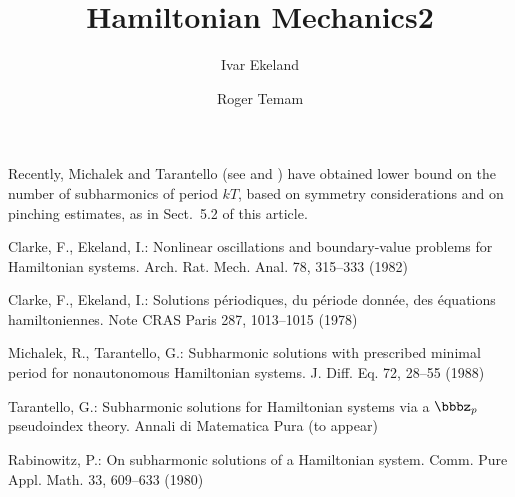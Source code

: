 \documentclass{llncs}
\begin{document}
    Recently, Michalek and Tarantello (see \cite{mich:tar} and \cite{tar})
    have obtained lower bound on the number of subharmonics of period $kT$,
    based on symmetry considerations and on pinching estimates, as in
    Sect.~5.2 of this article.
    
    \begin{thebibliography}{5}
    Clarke, F., Ekeland, I.:
    Nonlinear oscillations and
    boundary-value problems for Hamiltonian systems.
    Arch. Rat. Mech. Anal. 78, 315--333 (1982)
    
    Clarke, F., Ekeland, I.:
    Solutions p\'{e}riodiques, du
    p\'{e}riode donn\'{e}e, des \'{e}quations hamiltoniennes.
    Note CRAS Paris 287, 1013--1015 (1978)
    
    Michalek, R., Tarantello, G.:
    Subharmonic solutions with prescribed minimal
    period for nonautonomous Hamiltonian systems.
    J. Diff. Eq. 72, 28--55 (1988)
    
    Tarantello, G.:
    Subharmonic solutions for Hamiltonian
    systems via a $\bbbz_{p}$ pseudoindex theory.
    Annali di Matematica Pura (to appear)
    
    Rabinowitz, P.:
    On subharmonic solutions of a Hamiltonian system.
    Comm. Pure Appl. Math. 33, 609--633 (1980)
    
    \end{thebibliography}
    
    \title{Hamiltonian Mechanics2}
    
    \author{Ivar Ekeland \and Roger Temam}
    
    
\end{document}
